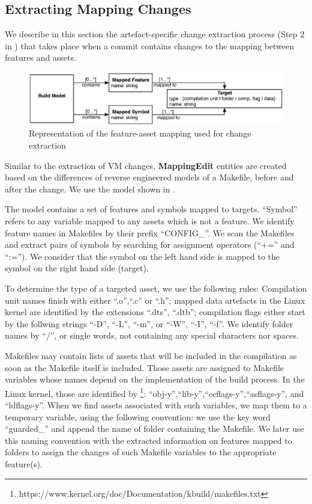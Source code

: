 \subsection{Extracting Mapping Changes}
\label{sec_mapping_model}

We describe in this section the artefact-specific change extraction process (Step 2 in )
that takes place when a commit contains changes to the mapping between features and assets.

\begin{figure}[h]
	\centering
	\includegraphics[scale=0.40]{EMF_Build_Model.eps}
	\caption{Representation of the feature-asset mapping used for change extraction}
	\label{fig:mapping_for_diff}
\end{figure}

Similar to the extraction of VM changes, \textbf{MappingEdit} entities are created based on the differences 
of reverse engineered models of a Makefile, before and after the change.
We use the model shown in .

The model contains a set of features and symbols mapped to targets. 
``Symbol'' refers to any variable mapped to any assets which is not a feature. 
We identify feature names in Makefiles by their prefix ``CONFIG\_''.
We scan the Makefiles and extract pairs of symbols by searching for assignment operators (``+='' and ``:=''). 
We consider that the symbol on the left hand side is mapped to the symbol on the right hand side (target).

To determine the type of a targeted asset, we use the following rules:
Compilation unit names finish with either ``.o'',``.c'' or ``.h''; 
mapped data artefacts in the Linux kernel are identified by the extensions ``.dts'', ``.dtb''; 
compilation flags either start by the follwing strings ``-D'', ``-L'', ``-m'',  or ``-W'', ``-I'', ``-f''.
We identify folder names by ``/'', or single words, not containing any special characters nor spaces.

Makefiles may contain lists of assets that will be included in the compilation 
as soon as the Makefile itself is included.
Those assets are assigned to Makefile variables whose names depend on the implementation of the build process.
In the Linux kernel, those are identified by \footnote{https://www.kernel.org/doc/Documentation/kbuild/makefiles.txt}:
``obj-y'',``lib-y'',``ccflags-y'',``asflags-y'', and ``ldflags-y''.
When we find assets associated with such variables, we map them to a temporary variable, using the following convention: we use the
key word ``guarded\_'' and append the name of folder containing the Makefile.
We later use this naming convention with the extracted information on features mapped to folders 
to assign the changes of such Makefile variables to the appropriate feature(s).

